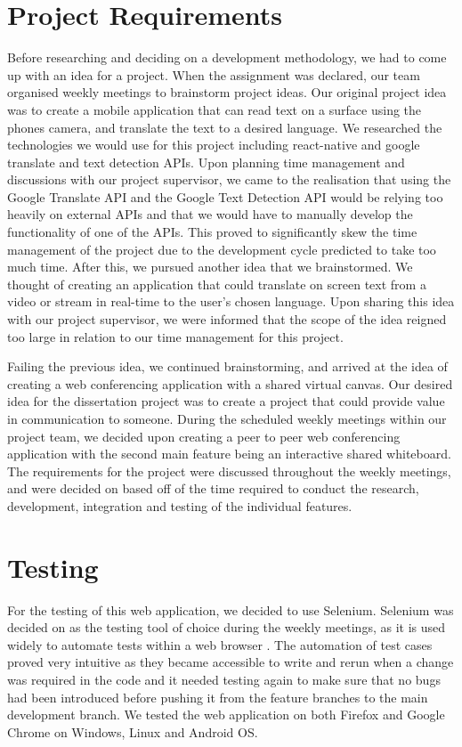 \section{Project Requirements}
Before researching and deciding on a development methodology, we had to come up with an idea for a project. When the assignment was declared, our team organised weekly meetings to brainstorm project ideas. Our original project idea was to create a mobile application that can read text on a surface using the phones camera, and translate the text to a desired language. We researched the technologies we would use for this project including react-native and google translate and text detection APIs. Upon planning time management and discussions with our project supervisor, we came to the realisation that using the Google Translate API and the Google Text Detection API would be relying too heavily on external APIs and that we would have to manually develop the functionality of one of the APIs. This proved to significantly skew the time management of the project due to the development cycle predicted to take too much time.
After this, we pursued another idea that we brainstormed. We thought of creating an application that could translate on screen text from a video or stream in real-time to the user’s chosen language. Upon sharing this idea with our project supervisor, we were informed that the scope of the idea reigned too large in relation to our time management for this project.

Failing the previous idea, we continued brainstorming, and arrived at the idea of creating a web conferencing application with a shared virtual canvas. Our desired idea for the dissertation project was to create a project that could provide value in communication to someone. During the scheduled weekly meetings within our project team, we decided upon creating a peer to peer web conferencing application with the second main feature being an interactive shared whiteboard. The requirements for the project were discussed throughout the weekly meetings, and were decided on based off of the time required to conduct the research, development, integration and testing of the individual features.

\section{Testing}
For the testing of this web application, we decided to use Selenium. Selenium was decided on as the testing tool of choice during the weekly meetings, as it is used widely to automate tests within a web browser \cite{gundecha2012selenium}. The automation of test cases proved very intuitive as they became accessible to write and rerun when a change was required in the code and it needed testing again to make sure that no bugs had been introduced before pushing it from the feature branches to the main development branch. We tested the web application on both Firefox and Google Chrome on Windows, Linux and Android OS.


